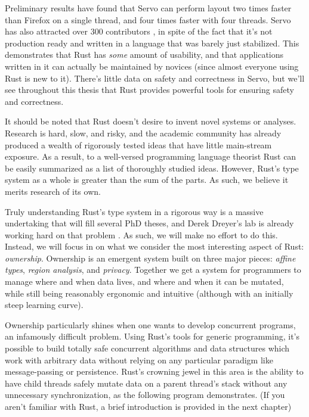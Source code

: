 Preliminary results \cite{servo-exp} have found that Servo can
perform layout two times faster than Firefox on a single thread, and four times
faster with four threads. Servo has also attracted over 300 contributors
\cite{servo-gh}, in spite of the fact that it's not production ready and
written in a language that was barely just stabilized. This demonstrates that
Rust has \emph{some} amount of usability, and that applications written in it
can actually be maintained by novices (since almost everyone using Rust
is new to it). There's little data on safety and correctness in Servo, but we'll
see throughout this thesis that Rust provides powerful tools for ensuring
safety and correctness.

It should be noted that Rust doesn't desire to invent novel systems or analyses.
Research is hard, slow, and risky, and the academic community has already produced
a wealth of rigorously tested ideas that have little main-stream exposure. As a
result, to a well-versed programming language theorist Rust can be easily
summarized as a list of thoroughly studied ideas. However, Rust's type system
as a whole is greater than the sum of the parts. As such, we believe it merits
research of its own.

Truly understanding Rust's type system in a rigorous way is a massive
undertaking that will fill several PhD theses, and Derek Dreyer's lab is already
working hard on that problem \cite{rustbelt}. As such, we will make no effort
to do this. Instead, we will focus in on what we consider the most interesting
aspect of Rust: \emph{ownership}. Ownership is an emergent system built on three
major pieces: \emph{affine types}, \emph{region analysis}, and \emph{privacy}. Together we get
a system for programmers to manage where and when data lives, and where
and when it can be mutated, while still being reasonably ergonomic and intuitive
(although with an initially steep learning curve).

Ownership particularly shines when one wants to develop concurrent programs,
an infamously difficult problem. Using Rust's tools for generic programming,
it's possible to build totally safe concurrent algorithms and data structures
which work with arbitrary data without relying on any particular paradigm like
message-passing or persistence. Rust's crowning jewel in this area is the
ability to have child threads safely mutate data on a parent thread's stack
without any unnecessary synchronization, as the following program demonstrates.
(If you aren't familiar with Rust, a brief introduction is provided in the
next chapter)

